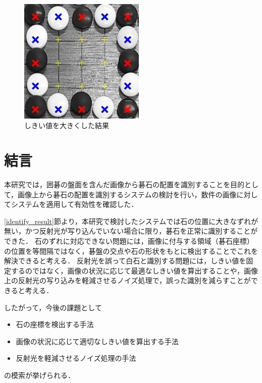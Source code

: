 \documentclass[openright]{nitocs}
\numberwithin{equation}{section}
\begin{document}
                \begin{figure}[tb] %
                    \begin{center}
                    \includegraphics[clip,width=60mm]{DSC_0098/ALT_result_trim.jpg} 
                    \caption{しきい値を大きくした結果}
                    \label{ex3_alt}
                    \end{center}
                \end{figure}           
    
    \section{結言}\label{sec:Item} %
        本研究では，囲碁の盤面を含んだ画像から碁石の配置を識別することを目的として，画像上から碁石の配置を識別するシステムの検討を行い，数件の画像に対してシステムを適用して有効性を確認した．

        \ref{identify_result}節より，本研究で検討したシステムでは石の位置に大きなずれが無い，かつ反射光が写り込んでいない場合に限り，碁石を正常に識別することができた．
        石のずれに対応できない問題には，画像に付与する領域（碁石座標）の位置を等間隔ではなく，碁盤の交点や石の形状をもとに検出することでこれを解決できると考える．
        反射光を誤って白石と識別する問題には，しきい値を固定するのではなく，画像の状況に応じて最適なしきい値を算出することや，画像上の反射光の写り込みを軽減させるノイズ処理で，誤った識別を減らすことができると考える．

        したがって，今後の課題として
        \begin{itemize}
            \item 石の座標を検出する手法
            \item 画像の状況に応じて適切なしきい値を算出する手法
            \item 反射光を軽減させるノイズ処理の手法
        \end{itemize}
        の模索が挙げられる．
\end{document}
